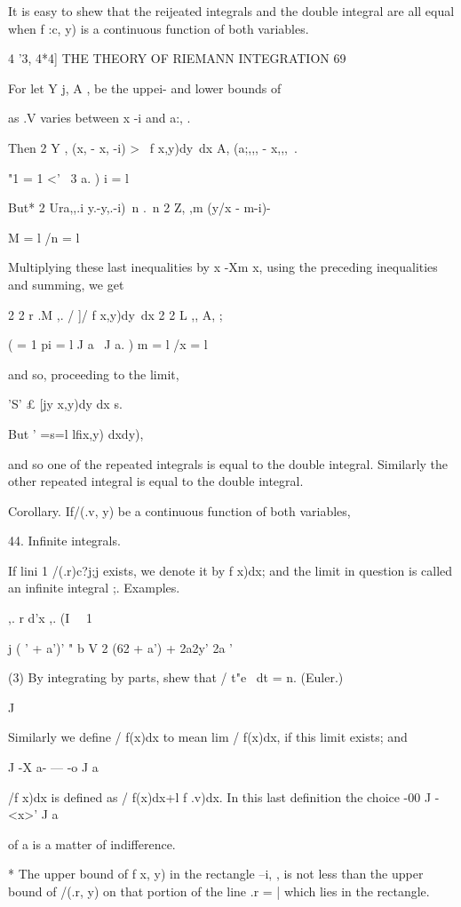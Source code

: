 It is easy to shew that the reijeated integrals and the double
integral are all equal when f :c, y) is a continuous function of both
variables.



4 '3, 4*4] THE THEORY OF RIEMANN INTEGRATION 69

For let Y j, A , be the uppei- and lower bounds of

as .V varies between x -i and a:, .

Then 2 Y , (x, - x, -i) > \ f x,y)dy\ dx A, (a;,,, - x,,,\ .

"1 = 1 <' \ 3 a. ) i = l

But* 2 Ura,,.i y.-y,.-i) \,n .\ n 2 Z, ,m (y/x - m-i)-

M = l /n = l

Multiplying these last inequalities by x -Xm x, using the preceding
inequalities and summing, we get

2 2 r .M ,. / ]/ f x,y)dy\ dx 2 2 L ,, A, ;

 ( = 1 pi = l J a \ J a. ) m = l /x = l

and so, proceeding to the limit,

'S' £ [jy x,y)dy dx s.

But ' =s=l lfix,y) dxdy),

and so one of the repeated integrals is equal to the double integral.
Similarly the other repeated integral is equal to the double integral.

Corollary. If/(.v, y) be a continuous function of both variables,

44. Infinite integrals.

If lini 1 /(.r)c?j;j exists, we denote it by f x)dx; and the limit in
question is called an infinite integral ;. Examples.

 ,. r d'x ,. (I \ \ 1

  j ( ' + a')' " b V 2 (62 + a') + 2a2y' 2a '

(3) By integrating by parts, shew that / t"e~ dt = n. (Euler.)

J

Similarly we define / f(x)dx to mean lim / f(x)dx, if this limit
exists; and

J -X a- — -o J a

/f x)dx is defined as / f(x)dx+l f .v)dx. In this last definition the
choice -00 J -<x>' J a

of a is a matter of indifference.

* The upper bound of f x, y) in the rectangle --i, , is not less than
the upper bound of /(.r, y) on that portion of the line .r = | which
lies in the rectangle.

